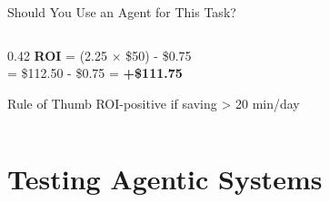 \documentclass[aspectratio=169,11pt]{beamer}
\begin{document}
\begin{frame}{Should You Use an Agent for This Task?}
\begin{columns}[T]
\begin{column}{0.42\textwidth}
            \textbf{ROI} = (2.25 $\times$ \$50) - \$0.75\\
            = \$112.50 - \$0.75 = \textbf{+\$111.75}

            \begin{block}{Rule of Thumb}
                ROI-positive if saving > 20 min/day
            \end{block}
        \end{column}
    \end{columns}
\end{frame}

\section{Testing Agentic Systems}
\end{document}
